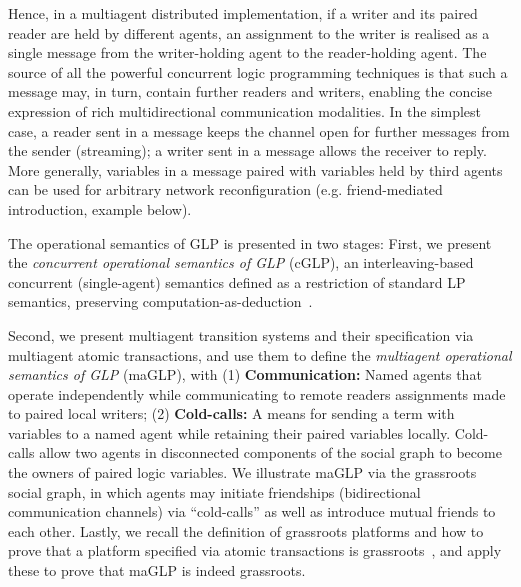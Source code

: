 Hence, in a multiagent distributed implementation, if a writer and its paired reader are held by different agents, an assignment to the writer is realised as a single message from the writer-holding agent to the reader-holding agent.  The source of all the powerful concurrent logic programming techniques is that such a message may, in turn, contain further readers and writers, enabling the concise expression of rich multidirectional communication modalities.  In the simplest case, a reader sent in a message keeps the channel open for further messages from the sender (streaming); a writer sent in a message allows the receiver to reply.  More generally, variables in a message paired with variables held by third agents can be used for arbitrary network reconfiguration (e.g. friend-mediated introduction, example below).


 The operational semantics of GLP is presented in two stages: First, we present the \emph{concurrent operational semantics of GLP} (cGLP), an interleaving-based concurrent (single-agent) semantics defined as a restriction of standard LP semantics, preserving computation-as-deduction~\cite{kowalski1974predicate}.

Second, we present multiagent transition systems and their specification via multiagent atomic transactions, and use them to define the \emph{multiagent operational semantics of GLP} (maGLP), with (1) \textbf{Communication:}  Named agents that operate independently while communicating to remote readers assignments made to paired local writers;  (2) \textbf{Cold-calls:} A means for sending a term with variables to a named agent while retaining their paired variables locally.
%
Cold-calls allow two agents in disconnected components of the social graph to become the owners of paired logic variables. We illustrate maGLP via the grassroots social graph, in which agents may initiate friendships (bidirectional communication channels) via ``cold-calls'' as well as introduce mutual friends to each other.
%
Lastly, we recall the definition of grassroots platforms and how to prove that a platform specified via atomic transactions is grassroots~\cite{shapiro2023grassrootsBA,shapiro2025atomic,lewis2026volitional}, and apply these to prove that maGLP is indeed grassroots.

